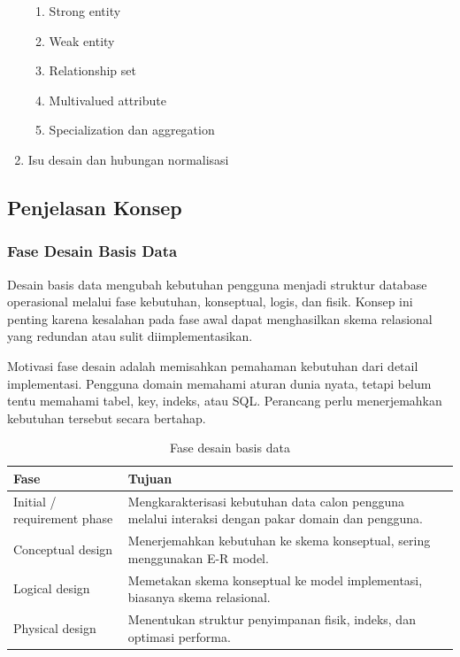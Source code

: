 \begin{enumerate}
    \begin{enumerate}
        \item \pwajib Strong entity
        \item \pwajib Weak entity
        \item \pwajib Relationship set
        \item \pwajib Multivalued attribute
        \item \ppaham Specialization dan aggregation
    \end{enumerate}
    \item \ppaham Isu desain dan hubungan normalisasi
\end{enumerate}

\subsection{Penjelasan Konsep}

\subsubsection{Fase Desain Basis Data}

\begin{jawab}
Desain basis data mengubah kebutuhan pengguna menjadi struktur database operasional melalui fase kebutuhan, konseptual, logis, dan fisik. Konsep ini penting karena kesalahan pada fase awal dapat menghasilkan skema relasional yang redundan atau sulit diimplementasikan.
\end{jawab}

Motivasi fase desain adalah memisahkan pemahaman kebutuhan dari detail implementasi. Pengguna domain memahami aturan dunia nyata, tetapi belum tentu memahami tabel, key, indeks, atau SQL. Perancang perlu menerjemahkan kebutuhan tersebut secara bertahap.

\begin{table}[H]
\centering
\begin{tabularx}{\textwidth}{|L{0.25\textwidth}|X|}
\hline
\textbf{Fase} & \textbf{Tujuan} \\
\hline
Initial / requirement phase & Mengkarakterisasi kebutuhan data calon pengguna melalui interaksi dengan pakar domain dan pengguna. \\
\hline
Conceptual design & Menerjemahkan kebutuhan ke skema konseptual, sering menggunakan E-R model. \\
\hline
Logical design & Memetakan skema konseptual ke model implementasi, biasanya skema relasional. \\
\hline
Physical design & Menentukan struktur penyimpanan fisik, indeks, dan optimasi performa. \\
\hline
\end{tabularx}
\caption{Fase desain basis data}
\label{tab:database-design-phases}
\end{table}

